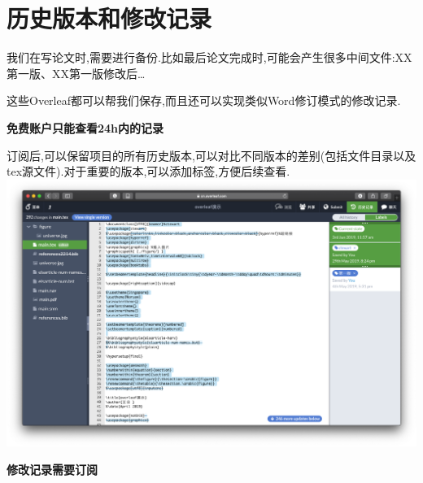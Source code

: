 \documentclass[]{ctexbook}
\begin{document}
\hypertarget{filehistory}{%
\section{历史版本和修改记录}\label{filehistory}}

我们在写论文时,需要进行备份.比如最后论文完成时,可能会产生很多中间文件:XX第一版、XX第一版修改后\ldots{}

这些Overleaf都可以帮我们保存,而且还可以实现类似Word修订模式的修改记录.

\textbf{免费账户只能查看24h内的记录}

订阅后,可以保留项目的所有历史版本,可以对比不同版本的差别(包括文件目录以及tex源文件).对于重要的版本,可以添加标签,方便后续查看.
\includegraphics{figure/history.png}

\textbf{修改记录需要订阅}
\end{document}
